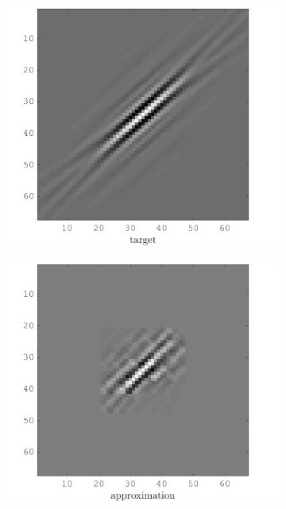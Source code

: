 \begin{figure}[!h]\centering
    \begin{subfigure}[b]{0.49\textwidth}\centering
    \includegraphics[width=\textwidth]{figures/xp/xp_128x128_sc2_angl1_K3_S3_node1_target.png}
    \end{subfigure}
\begin{subfigure}[b]{0.49\textwidth}\centering
\includegraphics[width=\textwidth]{figures/xp/xp_128x128_sc2_angl1_K3_S3_node1_approx.png}

\end{subfigure}
\end{figure}
